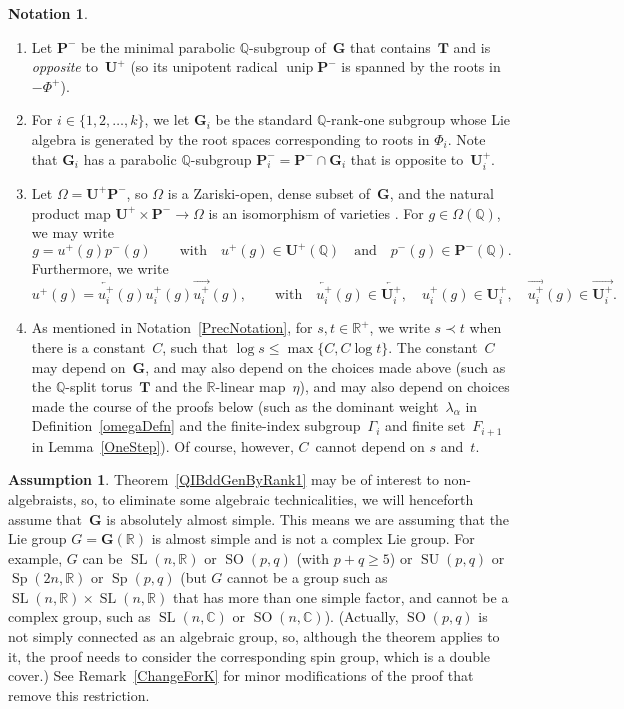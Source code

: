 \documentclass[pdftex]{sigma}
\newcommand{\CC}{\mathbb{C}}
\newcommand{\QQ}{\mathbb{Q}}
\newcommand{\RR}{\mathbb{R}}
\newcommand{\Ga}{\mathbf{G}}
\newcommand{\Pa}{\mathbf{P}}
\newcommand{\Ta}{\mathbf{T}}
\newcommand{\Ua}{\mathbf{U}}
\DeclareMathOperator{\SO}{SO}
\DeclareMathOperator{\Sp}{Sp}
\DeclareMathOperator{\SL}{SL}
\DeclareMathOperator{\SU}{SU}
\DeclareMathOperator{\unip}{unip}
\newcommand{\ra}{\overrightarrow}
\newcommand{\la}{\overleftarrow}
\numberwithin{equation}{section}
\theoremstyle{definition}
\newtheorem{assumption}[thm]{Assumption}
\newtheorem{notation}[thm]{Notation}
\begin{document}
\begin{notation}
\begin{enumerate}
\item Let $\Pa^-$ be the minimal parabolic $\QQ$-subgroup of~$\Ga$ that contains~$\Ta$ and is \emph{opposite} to~$\Ua^+$ (so its unipotent radical $\unip \Pa^-$ is spanned by the roots in $-\Phi^+$).

\item For $i \in \{1,2,\ldots,k\}$, we let $\Ga_i$ be the standard $\QQ$-rank-one subgroup whose Lie algebra is generated by the root spaces corresponding to roots in $\Phi_i$. Note that $\Ga_i$ has a parabolic $\QQ$-subgroup $\Pa_i^- = \Pa^- \cap \Ga_i$ that is opposite to~$\Ua_i^+$.

\item Let $\Omega = \Ua^+ \Pa^-$, so $\Omega$ is a Zariski-open, dense subset of~$\Ga$, and the natural product map $\Ua^+ \times \Pa^- \to \Omega$ is an isomorphism of varieties \cite[Proposition~4.10(d), pp.~88--89]{BorelTits-GrpRed}. For $g \in \Omega(\QQ)$, we may write
		\[ g = u^+(g) p^-(g) \qquad \text{with} \quad u^+(g) \in \Ua^+(\QQ) \quad \text{and} \quad p^-(g) \in \Pa^-(\QQ) . \]
Furthermore, we write
	\[ u^+(g) = \la{u^+_i}(g) u^+_i(g) \ra{u^+_i}(g) , \qquad \text{with} \quad \la{u^+_i}(g) \in \la{\Ua_i^+}, \quad u^+_i(g) \in \Ua_i^+, \quad \ra{u^+_i}(g) \in \ra{\Ua_i^+} .\]
	
	\item As mentioned in Notation~\ref{PrecNotation}, for $s,t \in \RR^+$, we write $s \prec t$ when there is a constant~$C$, such that $\log s \le \max\{C, C \log t\}$. The constant~$C$ may depend on~$\Ga$, and may also depend on the choices made above (such as the $\QQ$-split torus~$\Ta$ and the $\RR$-linear map~$\eta$), and may also depend on choices made the course of the proofs below (such as the dominant weight~$\lambda_\alpha$ in Definition~\ref{omegaDefn} and the finite-index subgroup~$\Gamma_i$ and finite set~$F_{i+1}$ in Lemma~\ref{OneStep}). Of course, however, $C$~cannot depend on $s$ and~$t$.
\end{enumerate}
\end{notation}

\begin{assumption} \label{AbsSimple}Theorem~\ref{QIBddGenByRank1} may be of interest to non-algebraists, so, to eliminate some algebraic technicalities, we will henceforth assume that~$\Ga$ is absolutely almost simple. This means we are assuming that the Lie group $G = \Ga(\RR)$ is almost simple and is not a complex Lie group. For example, $G$ can be $\SL(n,\RR)$ or $\SO(p,q)$ (with $p + q \ge 5$) or $\SU(p,q)$ or $\Sp(2n,\RR)$ or $\Sp(p,q)$ (but $G$ cannot be a group such as $\SL(n,\RR) \times \SL(n,\RR)$ that has more than one simple factor, and cannot be a complex group, such as $\SL(n,\CC)$ or $\SO(n,\CC)$).
(Actually, $\SO(p,q)$ is not simply connected as an algebraic group, so, although the theorem applies to it, the proof needs to consider the corresponding spin group, which is a double cover.)
See Remark~\ref{ChangeForK} for minor modifications of the proof that remove this restriction.
\end{assumption}
\end{document}
